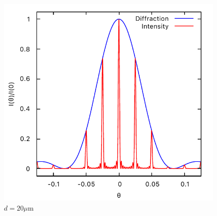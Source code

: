 \documentclass[11pt, twoside]{article}   	%
\theoremstyle{plain}
\theoremstyle{definition}
\begin{document}
\begin{description}
\begin{figure}[htbp]
		\begin{minipage}[t]{0.33\linewidth}
		\centering
		\includegraphics[width=0.9\linewidth]{d=20}
		\caption{$d=20\mu\mathrm{m}$}
		\end{minipage}
		\medskip


\end{figure}
\end{description}
\end{document}
